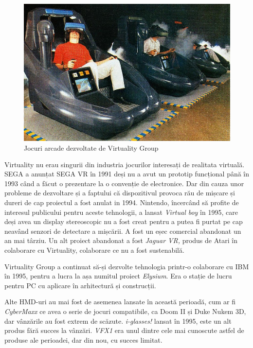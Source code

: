 \begin{figure}[h]
  \centering
  \includegraphics[scale=0.5]{img/virtuality.jpg}
  \caption{Jocuri arcade dezvoltate de Virtuality Group}
\end{figure}

Virtuality nu erau singurii din industria jocurilor interesați de realitata virtuală. SEGA a anunțat SEGA VR în 1991 deși nu a avut un prototip funcțional până în 1993 când a făcut o prezentare la o convenție de electronice. Dar din cauza unor probleme de dezvoltare și a faptului că dispozitivul provoca rău de mișcare și dureri de cap proiectul a fost anulat in 1994.
Nintendo, încercând să profite de interesul publicului pentru aceste tehnologii, a lansat \textit{Virtual boy} în 1995, care deși avea un display stereoscopic nu a fost creat pentru a putea fi purtat pe cap neavând senzori de detectare a mișcării. A fost un eșec comercial abandonat un an mai târziu. 
Un alt proiect abandonat a fost \textit{Jaguar VR,} produs de Atari în colaborare cu Virtuality, colaborare ce nu a fost sustenabilă.

Virtuality Group a continuat să-și dezvolte tehnologia printr-o colaborare cu IBM în 1995, pentru a lucra la așa numitul proiect \textit{Elysium}. Era o stație de lucru pentru PC cu aplicare în arhitectură și construcții.

Alte HMD-uri au mai fost de asemenea lansate în această perioadă, cum ar fi \textit{CyberMaxx} ce avea o serie de jocuri compatibile, ca Doom II și Duke Nukem 3D, dar vânzările au fost extrem de scăzute. \textit{i-glasses!} lansat în 1995, este un alt produs fără succes la vânzări.
\textit{VFX1} era unul dintre cele mai cunoscute astfel de produse ale perioadei, dar din nou, cu succes limitat.


